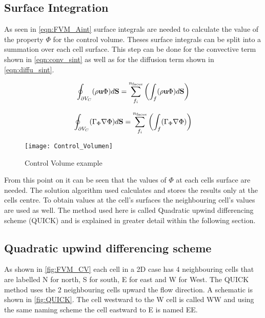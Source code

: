 \documentclass[../thesis.tex]{subfiles}
\begin{document}
\subsection{Surface Integration}

As seen in \autoref{eqn:FVM_Aint} surface integrals are needed to calculate the value of the property $\Phi$ for the control volume. Theses surface integrals can be split into a summation over each cell surface. This step can be done for the convective term shown in \autoref{eqn:conv_sint} as well as for the diffusion term shown in \autoref{eqn:diffu_sint}.

\begin{equation}
	\label{eqn:conv_sint}
	\oint_{\partial V_C} (\rho \bold{u} \Phi) d\bold{S} = \sum_{f_i}^{n_{\text{faces}}}\left( \int_{f} (\rho \bold{u} \Phi) d\bold{S} \right)
\end{equation}

\begin{equation}
	\label{eqn:diffu_sint}
	\oint_{\partial V_C} (\Gamma_\Phi \nabla \Phi) d\bold{S} =  \sum_{f_i}^{n_{\text{faces}}}\left( \int_{f} (\Gamma_\Phi \nabla \Phi) \right)
\end{equation} 

\begin{figure}[htbp]
	\centering
	\texttt{[image: Control\_Volumen]}
	\caption{Control Volume example}
	\label{fig:FVM_CV}
\end{figure}

From this point on it can be seen that the values of $\Phi$ at each cells surface are needed. The solution algorithm used calculates and stores the results only at the cells centre. To obtain values at the cell's surfaces the neighbouring cell's values are used as well. The method used here is called Quadratic upwind differencing scheme (QUICK) and is explained in greater detail within the following section.

\subsection{Quadratic upwind differencing scheme}
\label{sec:QUICK}

As shown in \autoref{fig:FVM_CV} each cell in a 2D case has 4 neighbouring cells that are labelled N for north, S for south, E for east and W for West. The QUICK method uses the 2 neighbouring cells upward the flow direction. A schematic is shown in \autoref{fig:QUICK}. The cell westward to the W cell is called WW and using the same naming scheme the cell eastward to E is named EE.
\end{document}
